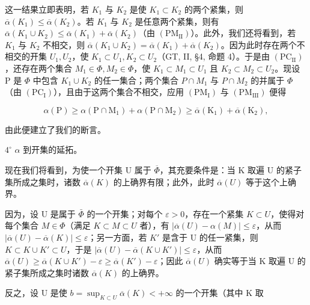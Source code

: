 这一结果立即表明，若 \(K_{1}\) 与 \(K_{2}\) 是使 \(K_{1} \subset K_{2}\) 的两个紧集，则 \(\overline{\alpha}(K_{1}) \leqslant \overline{\alpha}(K_{2})\)。若 \(K_{1}\) 与 \(K_{2}\) 是任意两个紧集，则有 \(\overline{\alpha}(K_{1} \cup K_{2}) \leqslant \overline{\alpha}(K_{1}) + \overline{\alpha}(K_{2})\)（由 \((\mathrm{PM}_{\mathrm{II}})\)）。此外，我们还将看到，若 \(K_{1}\) 与 \(K_{2}\) 不相交，则 \(\overline{\alpha}(K_{1} \cup K_{2}) = \overline{\alpha}(K_{1}) + \overline{\alpha}(K_{2})\)。因为此时存在两个不相交的开集 \(U_{1}, U_{2}\)，使 \(K_{1} \subset U_{1}, K_{2} \subset U_{2}\)（GT, II, §4, 命题 4）。于是由 \((\mathrm{PC}_{\mathrm{II}})\)，还存在两个集合 \(M_{1} \in \Phi, M_{2} \in \Phi\)，使 \(K_{1} \subset M_{1} \subset U_{1}\) 且 \(K_{2} \subset M_{2} \subset U_{2}\)。现设 P 是 \(\Phi\) 中包含 \(K_{1} \cup K_{2}\) 的任一集合；两个集合 \(P \cap M_{1}\) 与 \(P \cap M_{2}\) 的并属于 \(\Phi\)（由 \((\mathrm{PC}_{\mathrm{I}})\)），且由于这两个集合不相交，应用 \((\mathrm{PM}_{\mathrm{I}})\) 与 \((\mathrm{PM}_{\mathrm{III}})\) 便得

\[
\alpha (\mathrm{P}) \geqslant \alpha (\mathrm{P} \cap \mathrm{M} _ {1}) + \alpha (\mathrm{P} \cap \mathrm{M} _ {2}) \geqslant \overline {{\alpha}} (\mathrm{K} _ {1}) + \overline {{\alpha}} (\mathrm{K} _ {2}),
\]

由此便建立了我们的断言。

\(4^{\circ}\) \(\alpha\) 到开集的延拓。

现在我们将看到，为使一个开集 U 属于 \(\overline{\Phi}\)，其充要条件是：当 K 取遍 U 的紧子集所成之集时，诸数 \(\overline{\alpha}(K)\) 的上确界有限；此外，此时 \(\overline{\alpha}(U)\) 等于这个上确界。

因为，设 U 是属于 \(\bar{\Phi}\) 的一个开集；对每个 \(\varepsilon > 0\)，存在一个紧集 \(K \subset U\)，使得对每个集合 \(M \in \Phi\)（满足 \(K \subset M \subset U\) 者），有 \(|\overline{\alpha}(U) - \alpha(M)| \leqslant \varepsilon\)，从而 \(|\overline{\alpha}(U) - \overline{\alpha}(K)| \leqslant \varepsilon\)；另一方面，若 \(K'\) 是含于 U 的任一紧集，则 \(K \subset K \cup K' \subset U\)，于是 \(|\overline{\alpha}(U) - \overline{\alpha}(K \cup K')| \leqslant \varepsilon\)，从而 \(\overline{\alpha}(U) \geqslant \overline{\alpha}(K \cup K') - \varepsilon \geqslant \overline{\alpha}(K') - \varepsilon\)；因此 \(\overline{\alpha}(U)\) 确实等于当 K 取遍 U 的紧子集所成之集时诸数 \(\overline{\alpha}(K)\) 的上确界。

反之，设 U 是使 \(b = \sup_{K \subset U} \overline{\alpha}(K) < +\infty\) 的一个开集（其中 K 取

